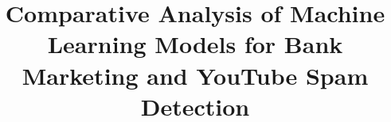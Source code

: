 \documentclass[conference]{IEEEtran}
\begin{document}
\title{Comparative Analysis of Machine Learning Models for Bank Marketing and YouTube Spam Detection
}

\author{
}

\maketitle
\end{document}
